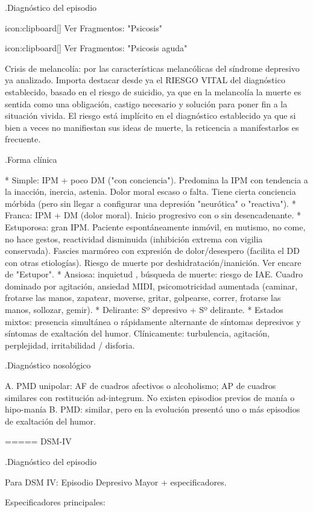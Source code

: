 .Diagnóstico del episodio

icon:clipboard[] Ver Fragmentos: "Psicosis"

icon:clipboard[] Ver Fragmentos: "Psicosis aguda"

Crisis de melancolía: por las características melancólicas del síndrome depresivo ya analizado. Importa destacar desde ya el RIESGO VITAL del diagnóstico establecido, basado en el riesgo de suicidio, ya que en la melancolía la muerte es sentida como una obligación, castigo necesario y solución para poner fin a la situación vivida. El riesgo está implícito en el diagnóstico establecido ya que si bien a veces no manifiestan sus ideas de muerte, la reticencia a manifestarlos es frecuente.

.Forma clínica

* Simple: IPM + poco DM ("con conciencia"). Predomina la IPM con tendencia a la inacción, inercia, astenia. Dolor moral escaso o falta. Tiene cierta conciencia mórbida (pero sin llegar a configurar una depresión "neurótica" o "reactiva").
* Franca: IPM + DM (dolor moral). Inicio progresivo con o sin desencadenante.
* Estuporosa: gran IPM. Paciente espontáneamente inmóvil, en mutismo, no come, no hace gestos, reactividad disminuida (inhibición extrema con vigilia conservada). Fascies marmóreo con expresión de dolor/desespero (facilita el DD con otras etiologías). Riesgo de muerte por deshidratación/inanición. Ver encare de "Estupor".
* Ansiosa: inquietud , búsqueda de muerte: riesgo de IAE. Cuadro dominado por agitación, ansiedad MIDI, psicomotricidad aumentada (caminar, frotarse las manos, zapatear, moverse, gritar, golpearse, correr, frotarse las manos, sollozar, gemir).
* Delirante: Sº depresivo + Sº delirante.
* Estados mixtos: presencia simultánea o rápidamente alternante de síntomas depresivos y síntomas de exaltación del humor. Clínicamente: turbulencia, agitación, perplejidad, irritabilidad / disforia.

.Diagnóstico nosológico

A. PMD unipolar: AF de cuadros afectivos o alcoholismo; AP de cuadros similares con restitución ad-integrum. No existen episodios previos de manía o hipo-manía
B. PMD: similar, pero en la evolución presentó uno o más episodios de exaltación del humor.

===== DSM-IV

.Diagnóstico del episodio

Para DSM IV: Episodio Depresivo Mayor + especificadores.

Especificadores principales:

